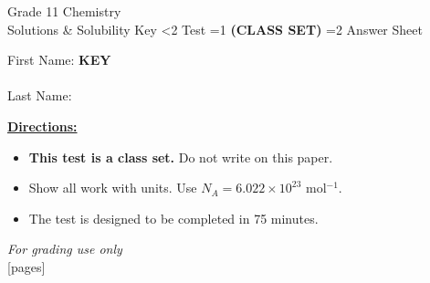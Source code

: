 \documentclass[addpoints]{exam}
\newcommand{\event}{Solutions \& Solubility}
\newcommand{\tournament}{}
\def\type{0}
\begin{document}
\begin{center}
    {\huge Grade 11 Chemistry \\ \event
    \ifprintanswers \space Key
    \else \space \ifnum\type<2 Test \fi \ifnum\type=1 \textbf{(CLASS SET)} \fi
          \ifnum\type=2 Answer Sheet \fi
    \fi \\ \vspace{3mm}\tournament\vspace{1mm}}
\end{center}

\vspace{.25\textheight}

\begin{center}
    First Name: \ifprintanswers
    \underline{\hspace{3.5cm}}\textbf{KEY}\underline{\hspace{5.5cm}}\\\vspace{5mm}
    \else \underline{\hspace{10cm}}\\ \vspace{5mm} \fi
    Last Name: \underline{\hspace{10cm}}\\ \vspace{5mm}
\end{center}

\noindent\textbf{\underline{Directions:}}
\begin{itemize}
    \ifnum\type=1 \item \textbf{This test is a class set.} Do not write on this paper. \fi
    \item Show all work with units. Use $N_A = 6.022 \times 10^{23}$ mol$^{-1}$.
    \item The test is designed to be completed in 75 minutes.
\end{itemize}
\begin{center}
\textit{For grading use only}\\
[pages]
\end{center}
\end{document}
